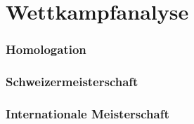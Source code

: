 \section{Wettkampfanalyse}

\begin{frame}
	\frametitle{Homologation}
	
\end{frame}

\begin{frame}
	\frametitle{Schweizermeisterschaft}
	
\end{frame}

\begin{frame}
	\frametitle{Internationale Meisterschaft}
	
\end{frame}